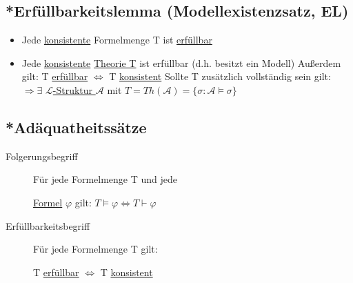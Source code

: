 \documentclass[12pt,a4paper]{article} %
\begin{document}
	\subsection{*Erfüllbarkeitslemma (Modellexistenzsatz, EL)}
	\begin{itemize}
		\item Jede \hyperref[ALKonsistent]{konsistente} Formelmenge T ist \hyperref[Erfullbar]{erfüllbar}
		\item Jede \hyperref[PLKonsistent]{konsistente} \hyperref[Theorie]{Theorie T} ist erfüllbar (d.h. besitzt ein Modell) \newline
		Außerdem gilt: T \hyperref[Erfullbar]{erfüllbar} $\Leftrightarrow$ T \hyperref[PLKonsistent]{konsistent} \newline
		Sollte T zusätzlich vollständig sein gilt: $\Rightarrow \exists$ \hyperref[Struktur]{$\mathcal{L}$-Struktur $\mathcal{A}$} mit $T = Th(\mathcal{A}) = \{\sigma : \mathcal{A} \hyperref[Erfullbar]{\vDash} \sigma\}$
	\end{itemize}
	
	\subsection{*Adäquatheitssätze}
	\begin{description}
		\item[Folgerungsbegriff] Für jede Formelmenge T und jede 
		
		\hyperref[Formel]{Formel} $\varphi$ gilt: $T \hyperref[Erfullbar]{\vDash} \varphi \Leftrightarrow T \hyperref[Beweisbar]{\vdash} \varphi$
		\item[Erfüllbarkeitsbegriff] Für jede Formelmenge T gilt: 
		
		T \hyperref[Erfullbar]{erfüllbar} $\Leftrightarrow$ T \hyperref[ALKonsistent]{konsistent}
	\end{description} 
	
\end{document}
